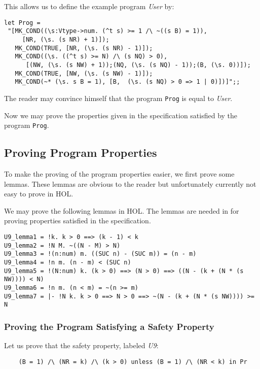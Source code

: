 This allows us to define the example program {\it User} by:

{\footnotesize 
\begin{verbatim}
let Prog =
 "[MK_COND((\s:Vtype->num. (^t s) >= 1 /\ ~((s B) = 1)),
     [NR, (\s. (s NR) + 1)]);
   MK_COND(TRUE, [NR, (\s. (s NR) - 1)]);
   MK_COND((\s. ((^t s) >= N) /\ (s NQ) > 0),
      [(NW, (\s. (s NW) + 1));(NQ, (\s. (s NQ) - 1));(B, (\s. 0))]);
   MK_COND(TRUE, [NW, (\s. (s NW) - 1)]);
   MK_COND(~* (\s. s B = 1), [B,  (\s. (s NQ) > 0 => 1 | 0)])]";;
\end{verbatim}
}

The reader may convince himself that the program {\tt Prog} is equal to
{\it User}.

Now we may prove the properties given in the specification satisfied by the 
program {\tt Prog}.


\subsection{Proving Program Properties}

To make the proving of the program properties easier, we first prove some 
lemmas.  These lemmas are obvious to the reader but unfortunately currently not
easy to prove in HOL.

\bigskip
We may prove the following lemmas in HOL.  The lemmas are needed in for proving
properties satisfied in the specification.

{\footnotesize 
\begin{verbatim}
U9_lemma1 = !k. k > 0 ==> (k - 1) < k
U9_lemma2 = !N M. ~((N - M) > N)
U9_lemma3 = !(n:num) m. ((SUC n) - (SUC m)) = (n - m)
U9_lemma4 = !n m. (n - m) < (SUC n)
U9_lemma5 = !(N:num) k. (k > 0) ==> (N > 0) ==> ((N - (k + (N * (s NW)))) < N)
U9_lemma6 = !n m. (n < m) = ~(n >= m)
U9_lemma7 = |- !N k. k > 0 ==> N > 0 ==> ~(N - (k + (N * (s NW)))) >= N
\end{verbatim}
}

\subsubsection{Proving the Program Satisfying a Safety Property}

Let us prove that the safety property, labeled {\it U9}:

{\footnotesize 
\begin{verbatim}
	(B = 1) /\ (NR = k) /\ (k > 0) unless (B = 1) /\ (NR < k) in Pr
\end{verbatim}
}

